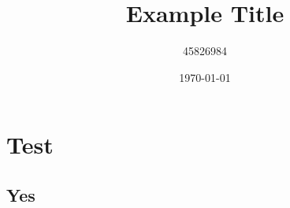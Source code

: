 \documentclass[twocolumn]{report}
\title{Example Title}
\author{45826984}
\date{\today}
\begin{document}
    \maketitle

    \tableofcontents


    \chapter{Test}
    \label{chap:Test}
    \setcounter{page}{1}
    \section{Yes}
    \label{sec:Yes}
\end{document}
